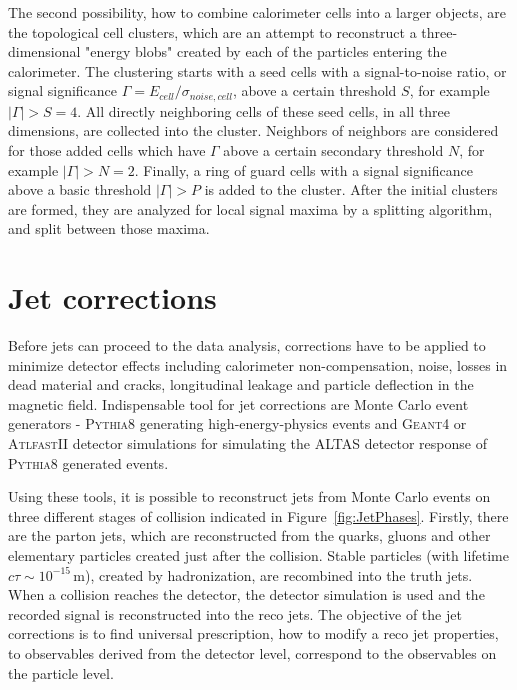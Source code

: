 The second possibility, how to combine calorimeter cells into a larger objects,
are the topological cell clusters, which are an attempt to reconstruct a
three-dimensional "energy blobs" created by each of the particles entering the
calorimeter.  The clustering starts with a seed cells with a signal-to-noise
ratio, or signal significance $\Gamma = E_{cell} / \sigma_{noise,cell}$, above a
certain threshold $S$, for example $|\Gamma| > S = 4$.  All directly neighboring cells
of these seed cells, in all three dimensions, are collected into the cluster.
Neighbors of neighbors are considered for those added cells which have $\Gamma$
above a certain secondary threshold $N$, for example $|\Gamma| > N = 2$. Finally, a ring of
guard cells with a signal significance above a basic threshold $|\Gamma| > P$ is
added to the cluster. After the initial clusters are formed, they are analyzed
for local signal maxima by a splitting algorithm, and split between those
maxima.

\section{Jet corrections}

Before jets can proceed to the data analysis, corrections have to be applied to
minimize detector effects including calorimeter non-compensation, noise, losses
in dead material and cracks, longitudinal leakage and particle deflection in the
magnetic field. Indispensable tool for jet corrections are Monte Carlo event
generators - \textsc{Pythia8} \cite{Pythia8} generating high-energy-physics
events and \textsc{Geant4} \cite{Geant4} or \textsc{AtlfastII} \cite{AtlfastII}
detector simulations for simulating the ALTAS detector response of
\textsc{Pythia8} generated events.

Using these tools, it is possible to reconstruct jets from Monte Carlo events on three
different stages of collision indicated in Figure~\ref{fig:JetPhases}. Firstly,
there are the parton jets, which are reconstructed from the quarks, gluons and other
elementary particles created just after the collision. Stable particles (with
lifetime $c\tau \sim 10^{-15}\,\text{m}$), created by hadronization, are recombined into
the truth jets. When a collision reaches the detector, the detector simulation
is used and the recorded signal is reconstructed into the reco jets.
The objective of the jet corrections is to find universal prescription, how to
modify a reco jet properties, to observables derived from the detector level,
correspond to the observables on the particle level.

